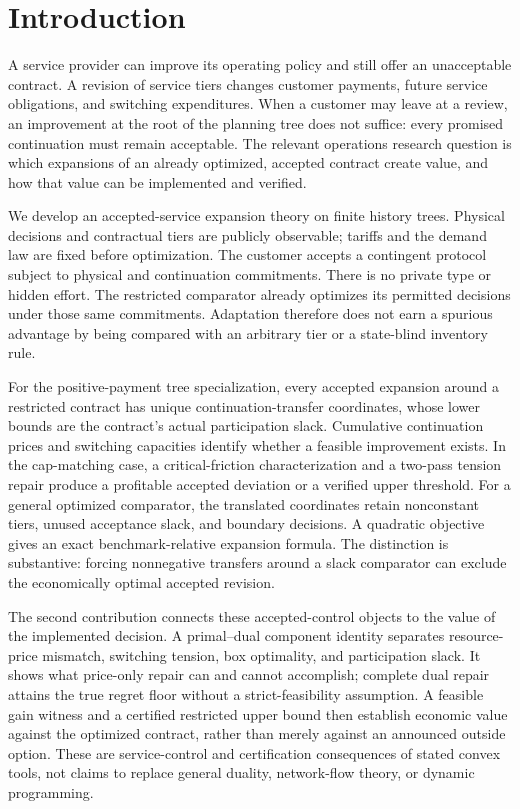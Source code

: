 \documentclass[11pt,letterpaper]{article}
\theoremstyle{definition}
\newcommand{\1}{\mathbf 1}
\begin{document}
\section{Introduction}
A service provider can improve its operating policy and still offer an
unacceptable contract. A revision of service tiers changes customer payments,
future service obligations, and switching expenditures. When a customer may
leave at a review, an improvement at the root of the planning tree does not
suffice: every promised continuation must remain acceptable. The relevant
operations research question is which expansions of an already optimized,
accepted contract create value, and how that value can be implemented and
verified.

We develop an accepted-service expansion theory on finite history trees.
Physical decisions and contractual tiers are publicly observable; tariffs and
the demand law are fixed before optimization. The customer accepts a contingent
protocol subject to physical and continuation commitments. There is no private
type or hidden effort. The restricted comparator already optimizes its
permitted decisions under those same commitments. Adaptation therefore does
not earn a spurious advantage by being compared with an arbitrary tier or a
state-blind inventory rule.

For the positive-payment tree specialization, every accepted expansion around a
restricted contract has unique continuation-transfer coordinates, whose lower
bounds are the contract's actual participation slack. Cumulative continuation
prices and switching capacities identify whether a feasible improvement exists.
In the cap-matching case, a critical-friction characterization and a two-pass
tension repair produce a profitable accepted deviation or a verified upper
threshold. For a general optimized comparator, the translated coordinates retain
nonconstant tiers, unused acceptance slack, and boundary decisions. A quadratic
objective gives an exact benchmark-relative expansion formula. The distinction
is substantive: forcing nonnegative transfers around a slack comparator can
exclude the economically optimal accepted revision.

The second contribution connects these accepted-control objects to the value
of the implemented decision. A primal--dual component identity separates
resource-price mismatch, switching tension, box optimality, and participation
slack. It shows what price-only repair can and cannot accomplish; complete dual
repair attains the true regret floor without a strict-feasibility assumption.
A feasible gain witness and a certified restricted upper bound then establish
economic value against the optimized contract, rather than merely against an
announced outside option. These are service-control and certification
consequences of stated convex tools, not claims to replace general duality,
network-flow theory, or dynamic programming.
\end{document}
